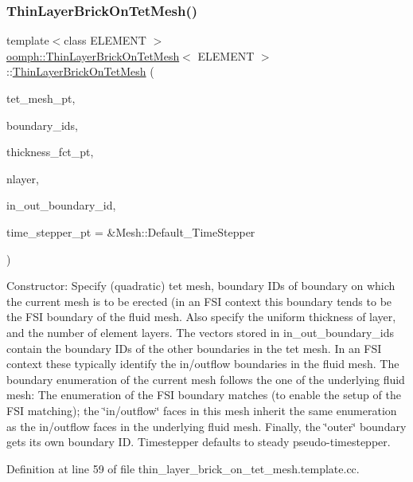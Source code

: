 \subsubsection{\texorpdfstring{Thin\+Layer\+Brick\+On\+Tet\+Mesh()}{ThinLayerBrickOnTetMesh()}}
{\footnotesize\ttfamily template$<$class E\+L\+E\+M\+E\+NT $>$ \\
\hyperlink{classoomph_1_1ThinLayerBrickOnTetMesh}{oomph\+::\+Thin\+Layer\+Brick\+On\+Tet\+Mesh}$<$ E\+L\+E\+M\+E\+NT $>$\+::\hyperlink{classoomph_1_1ThinLayerBrickOnTetMesh}{Thin\+Layer\+Brick\+On\+Tet\+Mesh} (\begin{DoxyParamCaption}\item[{Mesh $\ast$}]{tet\+\_\+mesh\+\_\+pt,  }\item[{const Vector$<$ unsigned $>$ \&}]{boundary\+\_\+ids,  }\item[{\hyperlink{classoomph_1_1ThinLayerBrickOnTetMesh_aed34f7d1e9a5c6b5f3e220cb5bdf4550}{Thickness\+Fct\+Pt}}]{thickness\+\_\+fct\+\_\+pt,  }\item[{const unsigned \&}]{nlayer,  }\item[{const Vector$<$ Vector$<$ unsigned $>$ $>$ \&}]{in\+\_\+out\+\_\+boundary\+\_\+id,  }\item[{Time\+Stepper $\ast$}]{time\+\_\+stepper\+\_\+pt = {\ttfamily \&Mesh\+:\+:Default\+\_\+TimeStepper} }\end{DoxyParamCaption})}



Constructor\+: Specify (quadratic) tet mesh, boundary I\+Ds of boundary on which the current mesh is to be erected (in an F\+SI context this boundary tends to be the F\+SI boundary of the fluid mesh. Also specify the uniform thickness of layer, and the number of element layers. The vectors stored in in\+\_\+out\+\_\+boundary\+\_\+ids contain the boundary I\+Ds of the other boundaries in the tet mesh. In an F\+SI context these typically identify the in/outflow boundaries in the fluid mesh. The boundary enumeration of the current mesh follows the one of the underlying fluid mesh\+: The enumeration of the F\+SI boundary matches (to enable the setup of the F\+SI matching); the \char`\"{}in/outflow\char`\"{} faces in this mesh inherit the same enumeration as the in/outflow faces in the underlying fluid mesh. Finally, the \char`\"{}outer\char`\"{} boundary gets its own boundary ID. Timestepper defaults to steady pseudo-\/timestepper. 



Definition at line 59 of file thin\+\_\+layer\+\_\+brick\+\_\+on\+\_\+tet\+\_\+mesh.\+template.\+cc.



